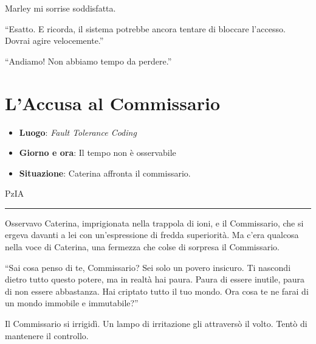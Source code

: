 Marley mi sorrise soddisfatta.

\begin{dialogue}
 \enquote{Esatto. E ricorda, il sistema potrebbe ancora tentare di bloccare l'accesso. Dovrai agire velocemente.}
\end{dialogue}


\begin{dialogue}
 \enquote{Andiamo! Non abbiamo tempo da perdere.}
\end{dialogue}




\section{L'Accusa al Commissario}

\begin{tcolorbox}[colback=gray!5,colframe=gray!80,title=\textbf{Scheda Informativa}]
\begin{itemize}
    \item \textbf{Luogo}: \emph{Fault Tolerance Coding}
    \item \textbf{Giorno e ora}: Il tempo non è osservabile
    \item \textbf{Situazione}: Caterina affronta il commissario.
\end{itemize}
\end{tcolorbox}

\vspace{1em}
\begin{center}PzIA\end{center}
\hrule
\vspace{1em}

Osservavo Caterina, imprigionata nella trappola di ioni, e il Commissario, che si ergeva davanti a lei con un'espressione di fredda superiorità. Ma c'era qualcosa nella voce di Caterina, una fermezza che colse di sorpresa il Commissario.

\begin{dialogue}  \enquote{Sai cosa penso di te, Commissario? Sei solo un povero insicuro. Ti nascondi dietro tutto questo potere, ma in realtà hai paura. Paura di essere inutile, paura di non essere abbastanza. Hai criptato tutto il tuo mondo. Ora cosa te ne farai di un mondo immobile e immutabile?} \end{dialogue}

Il Commissario si irrigidì. Un lampo di irritazione gli attraversò il volto. Tentò di mantenere il controllo.

